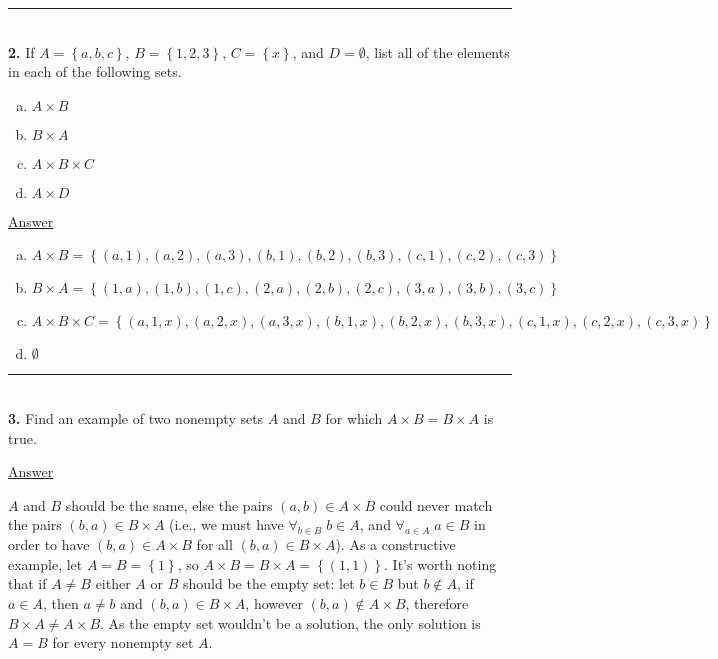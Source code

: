 \documentclass{article}[10pt]
\newenvironment{exercise}[1]
    {\noindent\rule{2cm}{0.4pt} \\
     \textbf{#1.}}
    {}
\newcommand{\answer}{

  \underline{Answer}

}
\begin{document}
\begin{exercise}{2}
  If $A = \left\{ a, b, c \right\}$,
     $B = \left\{ 1, 2, 3 \right\}$,
     $C = \left\{ x \right\}$, and
     $D = \emptyset$,
  list all of the elements in each of the following sets.
  \begin{enumerate}[(a)]
    \item $A \times B$
    \item $B \times A$
    \item $A \times B \times C$
    \item $A \times D$
  \end{enumerate}

  \answer
  \begin{enumerate}[(a)]
    \item $A \times B =
           \left\{(a, 1), (a, 2), (a, 3),
                  (b, 1), (b, 2), (b, 3),
                  (c, 1), (c, 2), (c, 3)\right\}$
    \item $B \times A =
           \left\{(1, a), (1, b), (1, c),
                  (2, a), (2, b), (2, c),
                  (3, a), (3, b), (3, c)\right\}$
    \item $A \times B \times C =
           \left\{(a, 1, x), (a, 2, x), (a, 3, x),
                  (b, 1, x), (b, 2, x), (b, 3, x),
                  (c, 1, x), (c, 2, x), (c, 3, x)\right\}$
    \item $\emptyset$
  \end{enumerate}

\end{exercise}


\begin{exercise}{3}
  Find an example of two nonempty sets $A$ and $B$ for which
  $A \times B = B \times A$ is true.
  \answer
  $A$ and $B$ should be the same,
  else the pairs $(a, b) \in A \times B$
  could never match the pairs $(b, a) \in B \times A$
  (i.e., we must have
   $\forall_{b \in B} \; b \in A$, and
   $\forall_{a \in A} \; a \in B$
   in order to have $(b, a) \in A \times B$
   for all $(b, a) \in B \times A$).
  As a constructive example, let $A = B = \left\{1\right\}$,
  so $A \times B = B \times A = \left\{(1, 1)\right\}$.
  It's worth noting that if $A \ne B$
  either $A$ or $B$ should be the empty set:
  let $b \in B$ but $b \notin A$,
  if $a \in A$, then $a \ne b$ and $(b, a) \in B \times A$,
  however $(b, a) \notin A \times B$,
  therefore $B \times A \ne A \times B$.
  As the empty set wouldn't be a solution,
  the only solution is $A = B$ for every nonempty set $A$.
\end{exercise}
\end{document}
